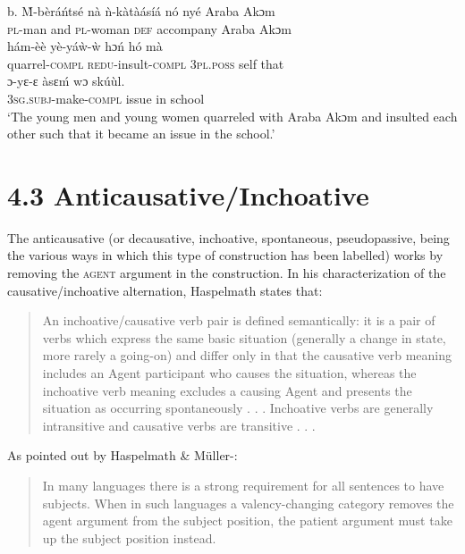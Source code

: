 \documentclass[output=paper]{langsci/langscibook}
\begin{document}
\gll  b.  \`{M}-b\`{e}r\'{a}\'{n}ts\'{e}  n\`{a}  \`{n}-k\`{a}t\`{a}\'{a}s\'{i}\'{a}  n\'{o}   ny\'{e}     Araba Akɔm  \\
       \textsc{pl}{}-man    and  \textsc{pl}{}-woman  \textsc{def}  accompany  Araba Akɔm\\
\gll   h\'{a}m-\`{e}\`{e}      y\`{e}-y\'{a}\`{w}-\`{w}    hɔ\'{n}    h\'{o}  m\`{a}\\
       quarrel-\textsc{compl}    \textsc{redu}{}-insult-\textsc{compl}  \textsc{3pl.poss}  self  that\\
\gll   ɔ{}-yɛ-ɛ        \`{a}sɛ\'{m}  wɔ  sk\'{u}\`{u}l.\\
       \textsc{3sg.subj}{}-make-\textsc{compl}  issue  in  school\\
\glt ‘The young men and young women quarreled with Araba Akɔm and insulted each other such that it became an issue in the school.’ \citep[21]{Martin1936}  
\z

\section{4.3  Anticausative/Inchoative}

The anticausative (or decausative, inchoative, spontaneous, pseudopassive, being the various ways in which this type of construction has been labelled) works by removing the \textsc{agent} argument in the construction. In his characterization of the causative/inchoative alternation, Haspelmath states that:

\begin{quote}
An inchoative/causative verb pair is defined semantically: it is a pair of verbs which express the same basic situation (generally a change in state, more rarely a going-on) and differ only in that the causative verb meaning includes an Agent participant who causes the situation, whereas the inchoative verb meaning excludes a causing Agent and presents the situation as occurring spontaneously . . . Inchoative verbs are generally intransitive and causative verbs are transitive . . . \citep[90]{Haspelmath1993}
\end{quote}

As pointed out by Haspelmath \& Müller-\citet[1132]{Bardey2004}: 

\begin{quote}
In many languages there is a strong requirement for all sentences to have subjects. When in such languages a valency-changing category removes the agent argument from the subject position, the patient argument must take up the subject position instead.
\end{quote}
\end{document}
